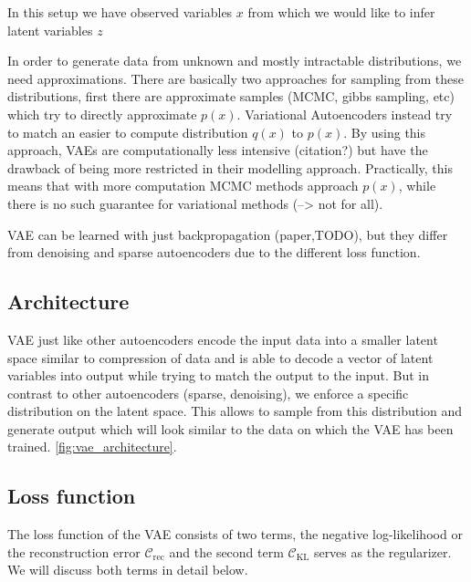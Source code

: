 \documentclass[twoside,11pt,a4paper]{article}
\theoremstyle{break}
\begin{document}
In this setup we have observed variables $x$ from which we would like to infer latent variables $z$


In order to generate data from unknown and mostly intractable distributions, we need approximations.
There are basically two approaches for sampling from these distributions,
first there are approximate samples (MCMC, gibbs sampling, etc) which try to directly approximate $p(x)$.
Variational Autoencoders instead try to match an easier to compute distribution $q(x)$ to $p(x)$.
By using this approach, VAEs are computationally less intensive (citation?) but have the drawback of being more restricted in their modelling approach.
Practically, this means that with more computation MCMC methods approach $p(x)$, while there is no such guarantee for variational methods (--> not for all).

VAE can be learned with just backpropagation (paper,TODO), but they differ from denoising and sparse autoencoders due to the different loss function.



\subsection{Architecture}
\label{sub:vae_architecture}
VAE just like other autoencoders encode the input data into a smaller latent space similar to compression of data and is able to decode a vector of latent variables into output while trying to match the output to the input.
But in contrast to other autoencoders (sparse, denoising), we enforce a specific distribution on the latent space.
This allows to sample from this distribution and generate output which will look similar to the data on which the VAE has been trained.
\ref{fig:vae_architecture}.

\subsection{Loss function}
The loss function of the VAE consists of two terms, the negative log-likelihood or the reconstruction error $\mathcal{C}_{\mathrm{rec}}$ and the second term $\mathcal{C}_{\mathrm{KL}}$ serves as the regularizer.
We will discuss both terms in detail below.
\end{document}
